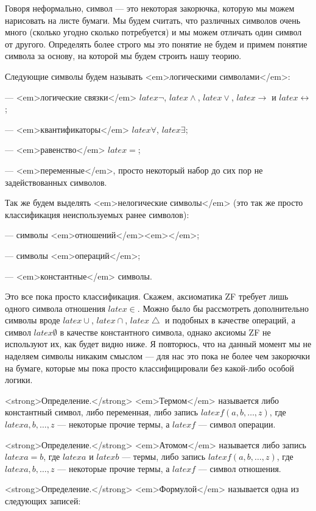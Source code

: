Говоря неформально, символ — это некоторая закорючка, которую мы можем нарисовать на листе бумаги. Мы будем считать, что различных символов очень много (сколько угодно сколько потребуется) и мы можем отличать один символ от другого. Определять более строго мы это понятие не будем и примем понятие символа за основу, на которой мы будем строить нашу теорию.

Следующие символы будем называть <em>логическими символами</em>:

— <em>логические связки</em> $latex \neg$, $latex \wedge$, $latex \vee$, $latex \rightarrow$ и $latex \leftrightarrow$;

— <em>квантификаторы</em> $latex \forall$, $latex \exists$;

— <em>равенство</em> $latex =$;

— <em>переменные</em>, просто некоторый набор до сих пор не задействованных символов.

Так же будем выделять <em>нелогические символы</em> (это так же просто классификация неиспользуемых ранее символов):

— символы <em>отношений</em><em></em>;

— символы <em>операций</em>;

— <em>константные</em> символы.

Это все пока просто классификация. Скажем, аксиоматика ZF требует лишь одного символа отношения $latex \in$. Можно было бы рассмотреть дополнительно символы вроде $latex \cup$, $latex \cap$, $latex \bigtriangleup$ и подобных в качестве операций, а символ $latex \emptyset$ в качестве константного символа, однако аксиомы ZF не используют их, как будет видно ниже. Я повторюсь, что на данный момент мы не наделяем символы никаким смыслом — для нас это пока не более чем закорючки на бумаге, которые мы пока просто классифицировали без какой-либо особой логики.

<strong>Определение.</strong> <em>Термом</em> называется либо константный символ, либо переменная, либо запись $latex f(a, b, \ldots, z)$, где $latex a, b, \ldots, z$ — некоторые прочие термы, а $latex f$ — символ операции.

<strong>Определение.</strong> <em>Атомом</em> называется либо запись $latex a = b$, где $latex a$ и $latex b$ — термы, либо запись $latex f(a, b, \ldots, z)$, где $latex a, b, \ldots, z$ — некоторые прочие термы, а $latex f$ — символ отношения.

<strong>Определение.</strong> <em>Формулой</em> называется одна из следующих записей:

